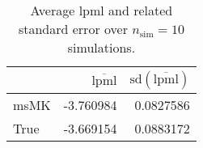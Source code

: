 \begin{table}[H]

\caption{Average lpml and related standard error over $n_{\text{sim}} = 10$ simulations.}
\centering
\begin{tabular}[t]{lrr}
\toprule
  & $\overbar{\text{lpml}}$ & $\text{sd}(\overbar{\text{lpml}})$\\
\midrule
msMK & -3.760984 & 0.0827586\\
True & -3.669154 & 0.0883172\\
\bottomrule
\end{tabular}
\end{table}